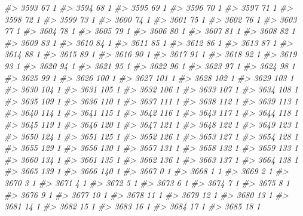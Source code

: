 \documentclass[]{article}
\newenvironment{Shaded}{\begin{snugshade}}{\end{snugshade}}
\newcommand{\CommentTok}[1]{\textcolor[rgb]{0.56,0.35,0.01}{\textit{#1}}}
\begin{document}
\begin{Shaded}
\begin{Highlighting}[]
\CommentTok{#> 3593  67  1}
\CommentTok{#> 3594  68  1}
\CommentTok{#> 3595  69  1}
\CommentTok{#> 3596  70  1}
\CommentTok{#> 3597  71  1}
\CommentTok{#> 3598  72  1}
\CommentTok{#> 3599  73  1}
\CommentTok{#> 3600  74  1}
\CommentTok{#> 3601  75  1}
\CommentTok{#> 3602  76  1}
\CommentTok{#> 3603  77  1}
\CommentTok{#> 3604  78  1}
\CommentTok{#> 3605  79  1}
\CommentTok{#> 3606  80  1}
\CommentTok{#> 3607  81  1}
\CommentTok{#> 3608  82  1}
\CommentTok{#> 3609  83  1}
\CommentTok{#> 3610  84  1}
\CommentTok{#> 3611  85  1}
\CommentTok{#> 3612  86  1}
\CommentTok{#> 3613  87  1}
\CommentTok{#> 3614  88  1}
\CommentTok{#> 3615  89  1}
\CommentTok{#> 3616  90  1}
\CommentTok{#> 3617  91  1}
\CommentTok{#> 3618  92  1}
\CommentTok{#> 3619  93  1}
\CommentTok{#> 3620  94  1}
\CommentTok{#> 3621  95  1}
\CommentTok{#> 3622  96  1}
\CommentTok{#> 3623  97  1}
\CommentTok{#> 3624  98  1}
\CommentTok{#> 3625  99  1}
\CommentTok{#> 3626 100  1}
\CommentTok{#> 3627 101  1}
\CommentTok{#> 3628 102  1}
\CommentTok{#> 3629 103  1}
\CommentTok{#> 3630 104  1}
\CommentTok{#> 3631 105  1}
\CommentTok{#> 3632 106  1}
\CommentTok{#> 3633 107  1}
\CommentTok{#> 3634 108  1}
\CommentTok{#> 3635 109  1}
\CommentTok{#> 3636 110  1}
\CommentTok{#> 3637 111  1}
\CommentTok{#> 3638 112  1}
\CommentTok{#> 3639 113  1}
\CommentTok{#> 3640 114  1}
\CommentTok{#> 3641 115  1}
\CommentTok{#> 3642 116  1}
\CommentTok{#> 3643 117  1}
\CommentTok{#> 3644 118  1}
\CommentTok{#> 3645 119  1}
\CommentTok{#> 3646 120  1}
\CommentTok{#> 3647 121  1}
\CommentTok{#> 3648 122  1}
\CommentTok{#> 3649 123  1}
\CommentTok{#> 3650 124  1}
\CommentTok{#> 3651 125  1}
\CommentTok{#> 3652 126  1}
\CommentTok{#> 3653 127  1}
\CommentTok{#> 3654 128  1}
\CommentTok{#> 3655 129  1}
\CommentTok{#> 3656 130  1}
\CommentTok{#> 3657 131  1}
\CommentTok{#> 3658 132  1}
\CommentTok{#> 3659 133  1}
\CommentTok{#> 3660 134  1}
\CommentTok{#> 3661 135  1}
\CommentTok{#> 3662 136  1}
\CommentTok{#> 3663 137  1}
\CommentTok{#> 3664 138  1}
\CommentTok{#> 3665 139  1}
\CommentTok{#> 3666 140  1}
\CommentTok{#> 3667   0  1}
\CommentTok{#> 3668   1  1}
\CommentTok{#> 3669   2  1}
\CommentTok{#> 3670   3  1}
\CommentTok{#> 3671   4  1}
\CommentTok{#> 3672   5  1}
\CommentTok{#> 3673   6  1}
\CommentTok{#> 3674   7  1}
\CommentTok{#> 3675   8  1}
\CommentTok{#> 3676   9  1}
\CommentTok{#> 3677  10  1}
\CommentTok{#> 3678  11  1}
\CommentTok{#> 3679  12  1}
\CommentTok{#> 3680  13  1}
\CommentTok{#> 3681  14  1}
\CommentTok{#> 3682  15  1}
\CommentTok{#> 3683  16  1}
\CommentTok{#> 3684  17  1}
\CommentTok{#> 3685  18  1}

\end{Highlighting}
\end{Shaded}
\end{document}
